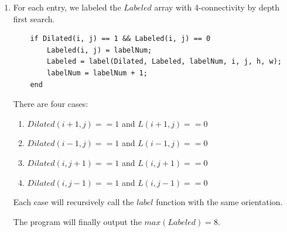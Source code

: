 \documentclass{article}
\begin{document}
\begin{enumerate}[label=(\alph*)]
\begin{enumerate}[label=(\roman*)]
            \item For each entry, we labeled the $Labeled$ array with 4-connectivity by depth first search.
        
            \begin{lstlisting}
    if Dilated(i, j) == 1 && Labeled(i, j) == 0
        Labeled(i, j) = labelNum;
        Labeled = label(Dilated, Labeled, labelNum, i, j, h, w);
        labelNum = labelNum + 1;
    end
            \end{lstlisting}

            \newpage
            There are four cases:

            \begin{enumerate}
                \item $Dilated(i + 1, j) == 1$ and $L(i + 1, j) == 0$
                \item $Dilated(i - 1, j) == 1$ and $L(i - 1, j) == 0$
                \item $Dilated(i, j + 1) == 1$ and $L(i, j + 1) == 0$
                \item $Dilated(i, j - 1) == 1$ and $L(i, j - 1) == 0$
            \end{enumerate}

            Each case will recursively call the $label$ function with the same orientation.
            
            The program will finally output the $max(Labeled) = 8$.
        \end{enumerate}


\end{enumerate}
\end{document}
